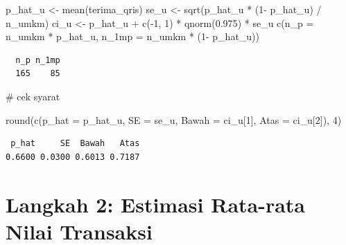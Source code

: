 \documentclass[
  indonesian,
  letterpaper,
]{book}
\newenvironment{Shaded}{\begin{snugshade}}{\end{snugshade}}
\newcommand{\AttributeTok}[1]{\textcolor[rgb]{0.40,0.45,0.13}{#1}}
\newcommand{\CommentTok}[1]{\textcolor[rgb]{0.37,0.37,0.37}{#1}}
\newcommand{\DecValTok}[1]{\textcolor[rgb]{0.68,0.00,0.00}{#1}}
\newcommand{\FloatTok}[1]{\textcolor[rgb]{0.68,0.00,0.00}{#1}}
\newcommand{\FunctionTok}[1]{\textcolor[rgb]{0.28,0.35,0.67}{#1}}
\newcommand{\NormalTok}[1]{\textcolor[rgb]{0.00,0.23,0.31}{#1}}
\newcommand{\OtherTok}[1]{\textcolor[rgb]{0.00,0.23,0.31}{#1}}
\newcommand{\SpecialCharTok}[1]{\textcolor[rgb]{0.37,0.37,0.37}{#1}}
\begin{document}
\begin{Shaded}
\begin{Highlighting}[]
\NormalTok{p\_hat\_u }\OtherTok{\textless{}{-}} \FunctionTok{mean}\NormalTok{(terima\_qris)}
\NormalTok{se\_u }\OtherTok{\textless{}{-}} \FunctionTok{sqrt}\NormalTok{(p\_hat\_u }\SpecialCharTok{*}\NormalTok{ (}\DecValTok{1}\SpecialCharTok{{-}}\NormalTok{ p\_hat\_u) }\SpecialCharTok{/}\NormalTok{ n\_umkm)}
\NormalTok{ci\_u }\OtherTok{\textless{}{-}}\NormalTok{ p\_hat\_u }\SpecialCharTok{+} \FunctionTok{c}\NormalTok{(}\SpecialCharTok{{-}}\DecValTok{1}\NormalTok{, }\DecValTok{1}\NormalTok{) }\SpecialCharTok{*} \FunctionTok{qnorm}\NormalTok{(}\FloatTok{0.975}\NormalTok{) }\SpecialCharTok{*}\NormalTok{ se\_u}
\FunctionTok{c}\NormalTok{(}\AttributeTok{n\_p =}\NormalTok{ n\_umkm }\SpecialCharTok{*}\NormalTok{ p\_hat\_u, }\AttributeTok{n\_1mp =}\NormalTok{ n\_umkm }\SpecialCharTok{*}\NormalTok{ (}\DecValTok{1}\SpecialCharTok{{-}}\NormalTok{ p\_hat\_u)) }
\end{Highlighting}
\end{Shaded}

\begin{verbatim}
  n_p n_1mp 
  165    85 
\end{verbatim}

\begin{Shaded}
\begin{Highlighting}[]
\CommentTok{\# cek syarat}
\end{Highlighting}
\end{Shaded}

\begin{Shaded}
\begin{Highlighting}[]
\FunctionTok{round}\NormalTok{(}\FunctionTok{c}\NormalTok{(}\AttributeTok{p\_hat =}\NormalTok{ p\_hat\_u, }\AttributeTok{SE =}\NormalTok{ se\_u, }\AttributeTok{Bawah =}\NormalTok{ ci\_u[}\DecValTok{1}\NormalTok{], }\AttributeTok{Atas =}\NormalTok{ ci\_u[}\DecValTok{2}\NormalTok{]), }\DecValTok{4}\NormalTok{)}
\end{Highlighting}
\end{Shaded}

\begin{verbatim}
 p_hat     SE  Bawah   Atas 
0.6600 0.0300 0.6013 0.7187 
\end{verbatim}

\section{Langkah 2: Estimasi Rata-rata Nilai
Transaksi}\label{langkah-2-estimasi-rata-rata-nilai-transaksi}
\end{document}
